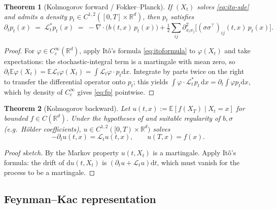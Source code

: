 \documentclass[11pt,letterpaper]{article}
\theoremstyle{plain}
\newtheorem{theorem}{Theorem}[section]
\theoremstyle{definition}
\theoremstyle{remark}
\newcommand{\R}{\mathbb{R}}
\newcommand{\E}{\mathbb{E}}
\newcommand{\dd}{\mathrm{d}}
\newcommand{\calL}{\mathcal{L}}
\newcommand{\divg}{\nabla\cdot}
\begin{document}
\begin{theorem}[Kolmogorov forward / Fokker--Planck]\label{thm:fp}
If $(X_t)$ solves \eqref{eq:ito-sde} and admits a density
$p_t\in C^{1,2}([0,T]\times\R^d)$, then $p_t$ satisfies
\begin{equation}
  \partial_t p_t(x) \;=\; \calL_t^* p_t(x)
  \;=\;-\divg\!\bigl(b(t,x)\,p_t(x)\bigr)
  +\tfrac12\sum_{ij}\partial^2_{x_ix_j}\!\bigl[(\sigma\sigma^\top)_{ij}(t,x)\,p_t(x)\bigr].
  \label{eq:fp}
\end{equation}
\end{theorem}
\begin{proof}
For $\varphi\in C_c^\infty(\R^d)$, apply It\^o's formula
\eqref{eq:itoformula} to $\varphi(X_t)$ and take expectations: the
stochastic-integral term is a martingale with mean zero, so
$\partial_t\E\varphi(X_t)=\E\calL_t\varphi(X_t)=\int\calL_t\varphi\cdot p_t\dd x$.
Integrate by parts twice on the right to transfer the differential operator
onto $p_t$; this yields $\int\varphi\cdot\calL_t^*p_t\,\dd x=\partial_t\int\varphi p_t\dd x$,
which by density of $C_c^\infty$ gives \eqref{eq:fp} pointwise.
\end{proof}

\begin{theorem}[Kolmogorov backward]\label{thm:kbe}
Let $u(t,x):=\E[f(X_T)\mid X_t=x]$ for bounded $f\in C(\R^d)$. Under the
hypotheses of  and suitable regularity of $b,\sigma$
(e.g.\ H\"older coefficients), $u\in C^{1,2}([0,T)\times\R^d)$ solves
\begin{equation}
  -\partial_t u(t,x) = \calL_t u(t,x),\qquad u(T,x)=f(x).
  \label{eq:kbe}
\end{equation}
\end{theorem}
\begin{proof}[Proof sketch]
By the Markov property $u(t,X_t)$ is a martingale. Apply It\^o's formula:
the drift of $\dd u(t,X_t)$ is $(\partial_t u+\calL_t u)\dd t$, which must
vanish for the process to be a martingale.
\end{proof}

\subsection{Feynman--Kac representation}
\end{document}
